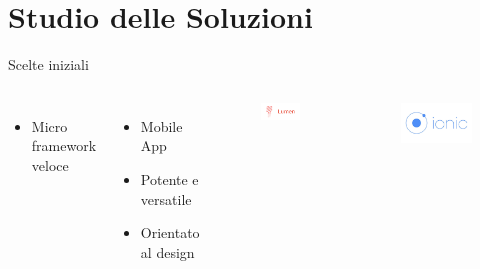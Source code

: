 \documentclass{beamer}
\begin{document}
\section{Studio delle Soluzioni}
\begin{frame}{Scelte iniziali}
\begin{columns}
		\begin{itemize}
		\item Micro framework veloce
		\end{itemize}
		\bigskip
		\bigskip
		\bigskip
		\bigskip
		\begin{itemize}
			\item Mobile App
			\item Potente e versatile
			\item Orientato al design
		\end{itemize}
	\begin{figure}[!h]
		\includegraphics[scale=0.25]{lumen-logo.png}
	\end{figure}
	\begin{figure}[!h]
		\includegraphics[scale=0.1]{ionic-logo.jpg}
	\end{figure}
\end{columns}
\end{frame}
\end{document}
